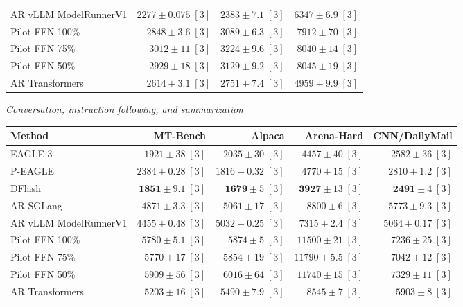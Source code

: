 \documentclass[conference,onecolumn]{IEEEtran}
\begin{document}
\begin{table}[!htp]
\begin{tabular}{@{}>{\raggedright\arraybackslash}p{3.7cm}rrr@{}}
AR \textperiodcentered{} vLLM ModelRunnerV1 & \(2277 \pm 0.075\;[3]\) & \(2383 \pm 7.1\;[3]\) & \(6347 \pm 6.9\;[3]\) \\
Pilot FFN 100\% & \(2848 \pm 3.6\;[3]\) & \(3089 \pm 6.3\;[3]\) & \(7912 \pm 70\;[3]\) \\
Pilot FFN 75\% & \(3012 \pm 11\;[3]\) & \(3224 \pm 9.6\;[3]\) & \(8040 \pm 14\;[3]\) \\
Pilot FFN 50\% & \(2929 \pm 18\;[3]\) & \(3129 \pm 9.2\;[3]\) & \(8045 \pm 19\;[3]\) \\
AR \textperiodcentered{} Transformers & \(2614 \pm 3.1\;[3]\) & \(2751 \pm 7.4\;[3]\) & \(4959 \pm 9.9\;[3]\) \\
\bottomrule
\end{tabular}\par\medskip
\textit{Conversation, instruction following, and summarization}\par\smallskip
\begin{tabular}{@{}>{\raggedright\arraybackslash}p{3.7cm}rrrr@{}}
\toprule
Method & MT-Bench & Alpaca & Arena-Hard & CNN/DailyMail \\
\midrule
EAGLE-3 & \(1921 \pm 38\;[3]\) & \(2035 \pm 30\;[3]\) & \(4457 \pm 40\;[3]\) & \(2582 \pm 36\;[3]\) \\
P-EAGLE & \(2384 \pm 0.28\;[3]\) & \(1816 \pm 0.32\;[3]\) & \(4770 \pm 15\;[3]\) & \(2810 \pm 1.2\;[3]\) \\
DFlash & \(\mathbf{1851} \pm 9.1\;[3]\) & \(\mathbf{1679} \pm 5\;[3]\) & \(\mathbf{3927} \pm 13\;[3]\) & \(\mathbf{2491} \pm 4\;[3]\) \\
AR \textperiodcentered{} SGLang & \(4871 \pm 3.3\;[3]\) & \(5061 \pm 17\;[3]\) & \(8800 \pm 6\;[3]\) & \(5773 \pm 9.3\;[3]\) \\
AR \textperiodcentered{} vLLM ModelRunnerV1 & \(4455 \pm 0.48\;[3]\) & \(5032 \pm 0.25\;[3]\) & \(7315 \pm 2.4\;[3]\) & \(5064 \pm 0.17\;[3]\) \\
Pilot FFN 100\% & \(5780 \pm 5.1\;[3]\) & \(5874 \pm 5\;[3]\) & \(11500 \pm 21\;[3]\) & \(7236 \pm 25\;[3]\) \\
Pilot FFN 75\% & \(5770 \pm 17\;[3]\) & \(5854 \pm 19\;[3]\) & \(11790 \pm 5.5\;[3]\) & \(7042 \pm 12\;[3]\) \\
Pilot FFN 50\% & \(5909 \pm 56\;[3]\) & \(6016 \pm 64\;[3]\) & \(11740 \pm 15\;[3]\) & \(7329 \pm 11\;[3]\) \\
AR \textperiodcentered{} Transformers & \(5203 \pm 16\;[3]\) & \(5490 \pm 7.9\;[3]\) & \(8545 \pm 7\;[3]\) & \(5903 \pm 8\;[3]\) \\

\end{tabular}
\end{table}
\end{document}
